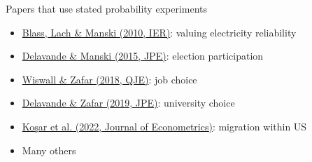 \documentclass[aspectratio=169]{beamer}
\begin{document}
\begin{frame}

Papers that use stated probability experiments

\bigskip

\begin{itemize}
\itemsep1.5em
\item<2-> \href{https://onlinelibrary.wiley.com/doi/full/10.1111/j.1468-2354.2010.00586.x}{Blass, Lach \& Manski (2010, IER)}: valuing electricity reliability
\item<3-> \href{https://www.sciencedirect.com/science/article/abs/pii/S0261379415000086}{Delavande \& Manski (2015, JPE)}: election participation
\item<4-> \href{https://academic.oup.com/qje/article/133/1/457/4095201}{Wiswall \& Zafar (2018, QJE)}: job choice
\item<5-> \href{https://www.journals.uchicago.edu/doi/full/10.1086/701808}{Delavande \& Zafar (2019, JPE)}: university choice
\item<6-> \href{https://www.sciencedirect.com/science/article/abs/pii/S0304407621000415}{Ko\c{s}ar et al. (2022, Journal of Econometrics)}: migration within US
\item<7-> Many others
\end{itemize}

\end{frame}
\end{document}
